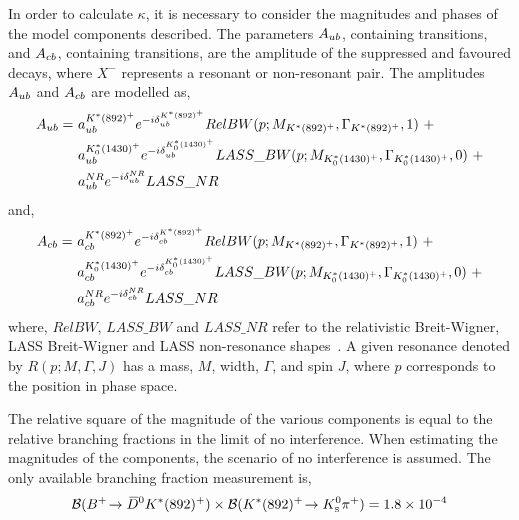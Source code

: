 In order to calculate $\kappa$, it is necessary to consider the magnitudes and phases of the model components described. The parameters $A_{{u}{b}}$, containing \decay{\bquark}{\uquark} transitions, and $A_{{c}{b}}$, containing \decay{\bquark}{\cquark} transitions, are the amplitude of the suppressed and favoured  decays, where $X^-$ represents a resonant or non-resonant \KS\pim pair. The amplitudes $A_{{u}{b}}$ and $A_{{c}{b}}$ are modelled as,
\begin{align*}
A_{\uquark\bquark} =\ & a_{\uquark\bquark}^{K^*(892)^+}e^{-i\delta_{\uquark\bquark}^{K^*(892)^+}}RelBW(p;M_{K^*(892)^+},\Gamma_{K^*(892)^+},1)\ + \\
& a_{\uquark\bquark}^{K^*_0(1430)^+}e^{-i\delta_{\uquark\bquark}^{K^*_0(1430)^+}}LASS\_BW(p;M_{K^*_0(1430)^+},\Gamma_{K^*_0(1430)^+},0)\ + \\
& a_{\uquark\bquark}^{NR}e^{-i\delta_{\uquark\bquark}^{NR}}LASS\_NR
\end{align*}
and,
\begin{align*}
A_{\cquark\bquark} =\ & a_{\cquark\bquark}^{K^*(892)^+}e^{-i\delta_{\cquark\bquark}^{K^*(892)^+}}RelBW(p;M_{K^*(892)^+},\Gamma_{K^*(892)^+},1)\ + \\
& a_{\cquark\bquark}^{K^*_0(1430)^+}e^{-i\delta_{\cquark\bquark}^{K^*_0(1430)^+}}LASS\_BW(p;M_{K^*_0(1430)^+},\Gamma_{K^*_0(1430)^+},0)\ + \\
& a_{\cquark\bquark}^{NR}e^{-i\delta_{\cquark\bquark}^{NR}}LASS\_NR
\end{align*}
where, $RelBW$, $LASS\_BW$ and $LASS\_NR$ refer to the relativistic Breit-Wigner, LASS Breit-Wigner and LASS non-resonance shapes~\cite{LASS}. A given resonance denoted by $R(p;M,\Gamma,J)$ has a mass, $M$, width, $\Gamma$, and spin $J$, where $p$ corresponds to the position in \decay{\Bm}{\D\KS\pim} phase space.%

The relative square of the magnitude of the various components is equal to the relative branching fractions in the limit of no interference. When estimating the magnitudes of the components, the scenario of no interference is assumed. The only available branching fraction measurement is,
\begin{equation*}
{\ensuremath{\mathcal{B}}}({{{B}^+}}\!\rightarrow {\ensuremath{{\kern 0.2em\overline{\kern -0.2em D}{}}{}^0}} K^*(892)^+) \times {\ensuremath{\mathcal{B}}}(K^*(892)^+\!\rightarrow {\ensuremath{{K}^0_{\mathrm{ \scriptscriptstyle S}}}}{\ensuremath{{\pi}^+}}) = 1.8 \times 10^{-4}
\end{equation*}

